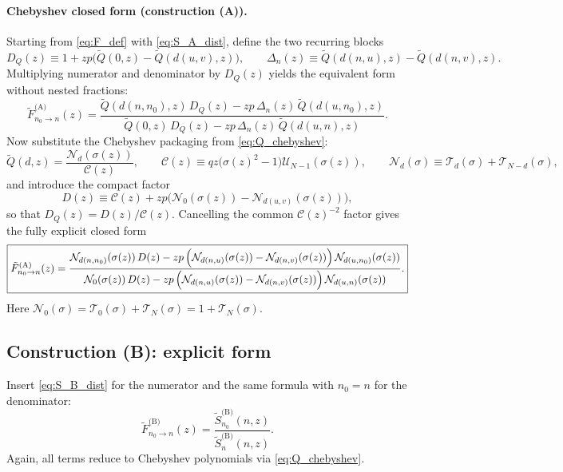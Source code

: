 \documentclass[11pt]{article}
\newcommand{\T}{\mathcal{T}}
\newcommand{\U}{\mathcal{U}}
\begin{document}
\paragraph{Chebyshev closed form (construction (A)).}
Starting from \eqref{eq:F_def} with \eqref{eq:S_A_dist}, define the two recurring blocks
\begin{equation}
D_Q(z)\equiv 1+z p\bigl(\tilde Q(0,z)-\tilde Q(d(u,v),z)\bigr),
\qquad
\Delta_n(z)\equiv \tilde Q(d(n,u),z)-\tilde Q(d(n,v),z).
\label{eq:DQ_Delta_def}
\end{equation}
Multiplying numerator and denominator by $D_Q(z)$ yields the equivalent form without nested fractions:
\begin{equation}
\boxed{
\tilde F^{\text{(A)}}_{n_0\to n}(z)=
\frac{
\tilde Q(d(n,n_0),z)\,D_Q(z)-z p\,\Delta_n(z)\,\tilde Q(d(u,n_0),z)
}{
\tilde Q(0,z)\,D_Q(z)-z p\,\Delta_n(z)\,\tilde Q(d(u,n),z)
}.
}
\label{eq:F_A_no_nested}
\end{equation}
Now substitute the Chebyshev packaging from \eqref{eq:Q_chebyshev}:
\[
\tilde Q(d,z)=\frac{\mathcal{N}_d(\sigma(z))}{\mathcal{C}(z)},
\qquad
\mathcal{C}(z)\equiv qz\bigl(\sigma(z)^2-1\bigr)\U_{N-1}(\sigma(z)),
\qquad
\mathcal{N}_d(\sigma)\equiv \T_d(\sigma)+\T_{N-d}(\sigma),
\]
and introduce the compact factor
\begin{equation}
\boxed{
D(z)\equiv \mathcal{C}(z)+z p\bigl(\mathcal{N}_0(\sigma(z))-\mathcal{N}_{d(u,v)}(\sigma(z))\bigr),
}
\label{eq:D_def}
\end{equation}
so that $D_Q(z)=D(z)/\mathcal{C}(z)$. Cancelling the common $\mathcal{C}(z)^{-2}$ factor gives the fully explicit closed form
\begin{equation}
\boxed{
\tilde F^{\text{(A)}}_{n_0\to n}(z)=
\frac{
\mathcal{N}_{d(n,n_0)}(\sigma(z))\,D(z)
-z p\,\Bigl(\mathcal{N}_{d(n,u)}(\sigma(z))-\mathcal{N}_{d(n,v)}(\sigma(z))\Bigr)\,\mathcal{N}_{d(u,n_0)}(\sigma(z))
}{
\mathcal{N}_{0}(\sigma(z))\,D(z)
-z p\,\Bigl(\mathcal{N}_{d(n,u)}(\sigma(z))-\mathcal{N}_{d(n,v)}(\sigma(z))\Bigr)\,\mathcal{N}_{d(u,n)}(\sigma(z))
}.
}
\label{eq:F_A_cheb_closed}
\end{equation}
Here $\mathcal{N}_0(\sigma)=\T_0(\sigma)+\T_N(\sigma)=1+\T_N(\sigma)$.

\subsection{Construction (B): explicit form}
Insert \eqref{eq:S_B_dist} for the numerator and the same formula with $n_0=n$ for the denominator:
\[
\tilde F^{\text{(B)}}_{n_0\to n}(z)=\frac{\tilde S^{\text{(B)}}_{n_0}(n,z)}{\tilde S^{\text{(B)}}_{n}(n,z)}.
\]
Again, all terms reduce to Chebyshev polynomials via \eqref{eq:Q_chebyshev}.
\end{document}
